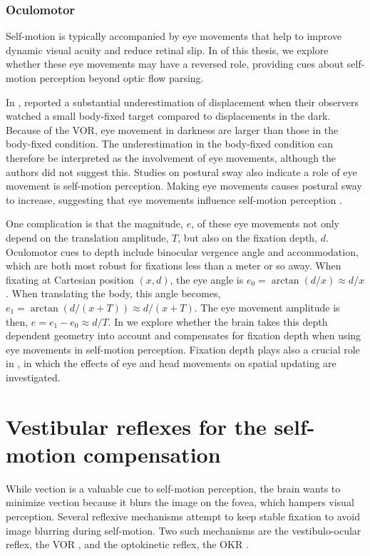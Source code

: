 \subsubsection{Oculomotor}
Self-motion is typically accompanied by eye movements that help to improve dynamic visual acuity and reduce retinal slip. In  of this thesis, we explore whether these eye movements may have a reversed role, providing cues about self-motion perception beyond optic flow parsing. 

In , \citeauthor{guedry1963} reported a substantial underestimation of displacement when their observers watched a small body-fixed target compared to displacements in the dark. Because of the VOR, eye movement in darkness are larger than those in the body-fixed condition. The underestimation in the body-fixed condition can therefore be interpreted as the involvement of eye movements, although the authors did not suggest this. Studies on postural sway also indicate a role of eye movement is self-motion perception. Making eye movements causes postural sway to increase, suggesting that eye movements influence self-motion perception \cite{glasauer2005,rodrigues2015}.

One complication is that the magnitude, $e$, of these eye movements not only depend on the translation amplitude, $T$, but also on the fixation depth, $d$. Oculomotor cues to depth include binocular vergence angle and accommodation, which are both most robust for fixations less than a meter or so away. When fixating at Cartesian position $(x, d)$, the eye angle is $e_0 = \arctan(d/x) \approx d/x$. When translating the body, this angle becomes, $e_1 = \arctan(d/(x+T)) \approx d/(x+T)$. The eye movement amplitude is then, $e = e_1 - e_0 \approx d/T$. In  we explore whether the brain takes this depth dependent geometry into account and compensates for fixation depth when using eye movements in self-motion perception. Fixation depth plays also a crucial role in , in which the effects of eye and head movements on spatial updating are investigated.


\section{Vestibular reflexes for the self-motion compensation}
While vection is a valuable cue to self-motion perception, the brain wants to minimize vection because it blurs the image on the fovea, which hampers visual perception. Several reflexive mechanisms attempt to keep stable fixation to avoid image blurring during self-motion. Two such mechanisms are the vestibulo-ocular reflex, the VOR \cite{goldberg2012}, and the optokinetic reflex, the OKR \cite{purves2012}.

